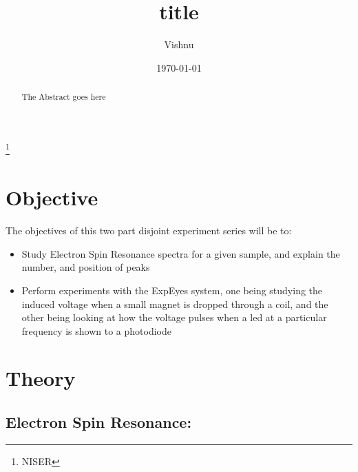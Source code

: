 \documentclass{double}
\begin{document}
\title{title}
\author{Vishnu} \thanks{NISER}
\date{\today}
\maketitle

\begin{abstract}

The Abstract goes here

\end{abstract}

\section{Objective}

The objectives of this two part disjoint experiment series will be to:

\begin{itemize}
\tightlist
\item
  Study Electron Spin Resonance spectra for a given sample, and explain the number, and position of peaks
\item
  Perform experiments with the ExpEyes system, one being studying the induced voltage when a small magnet is dropped through a coil, and the other being looking at how the voltage pulses when a led at a particular frequency is shown to a photodiode
\end{itemize}

\section{Theory}

\subsection{Electron Spin Resonance:}
\end{document}
